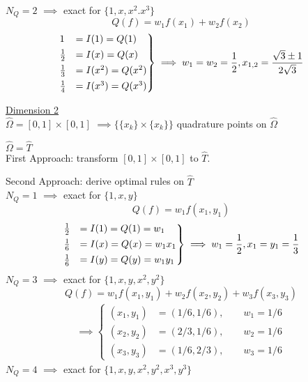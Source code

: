 $N_Q = 2$ $\implies$ exact for $\{1,x,x^2.x^3\}$
\begin{equation*}
	Q(f)= w_1f(x_1) + w_2f(x_2)
\end{equation*}
\begin{align*}
\begin{rcases}
	1 &= I(1)=Q(1)  \\
	\frac{1}{2} &= I(x)= Q(x)  \\
	\frac{1}{3}&=I(x^2)= Q(x^2) \\
	\frac{1}{4}&=I(x^3)= Q(x^3)
\end{rcases} \implies w_1=w_2= \frac{1}{2}, x_{1,2} = \frac{\sqrt{3}\pm 1}{2\sqrt{3}}
\end{align*}

\underline{Dimension 2}\\
$\hat{\Omega} = [0,1]\times [0,1]$ $\implies \{\{x_k\}\times\{x_k\} \}$ quadrature points on $\hat{\Omega}$

$\hat{\Omega} = \hat{T}$\\
First Approach: transform $[0,1]\times [0,1]$ to $\hat{T}$.

Second Approach: derive optimal rules on $\hat{T}$\\
$N_Q = 1$ $\implies$ exact for $\{1,x,y\}$
\begin{equation*}
Q(f)= w_1f(x_1,y_1)
\end{equation*}
\begin{align*}
\begin{rcases}
\frac{1}{2}&= I(1)= Q(1) = w_1  \\
\frac{1}{6}&= I(x)= Q(x) = w_1x_1  \\
\frac{1}{6}&= I(y)= Q(y) = w_1y_1\\
\end{rcases} \implies w_1= \frac{1}{2}, x_1=y_1 = \frac{1}{3}
\end{align*}
$N_Q = 3$ $\implies$ exact for $\{1,x,y,x^2,y^2\}$
\begin{equation*}
Q(f)= w_1f(x_1,y_1) + w_2f(x_2,y_2) + w_3f(x_3,y_3)
\end{equation*}
\begin{align*}\implies
\begin{cases}
(x_1,y_1)&= (1/6,1/6),  \qquad w_1= 1/6\\
(x_2,y_2)&= (2/3,1/6),  \qquad w_2= 1/6\\
(x_3,y_3)&= (1/6,2/3),  \qquad w_3= 1/6
\end{cases} 
\end{align*}
$N_Q = 4$ $\implies$ exact for $\{1,x,y,x^2,y^2,x^3,y^3\}$

